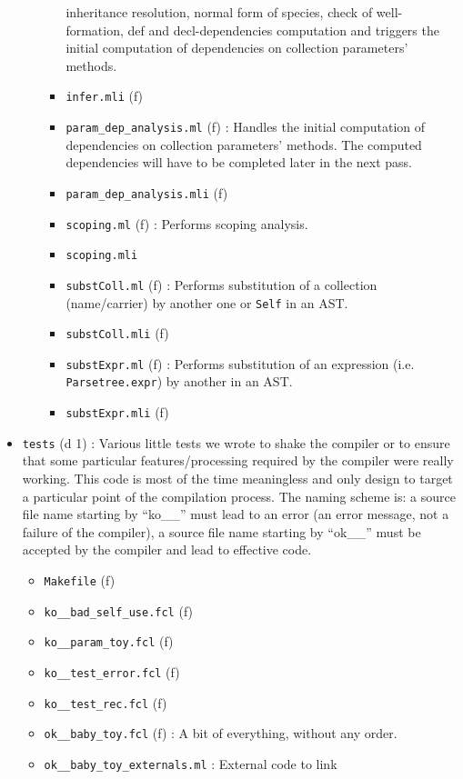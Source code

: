 \begin{itemize}
\begin{itemize}
\begin{itemize}
      inheritance resolution, normal form of species, check of
      well-formation, def and decl-dependencies computation and
      triggers the initial computation of dependencies on collection
      parameters' methods.
    \item {\tt infer.mli} (f)
    \item {\tt param\_dep\_analysis.ml} (f) : Handles the initial
      computation of dependencies on collection parameters'
      methods. The computed dependencies will have to be completed
      later in the next pass.
    \item {\tt param\_dep\_analysis.mli} (f)
    \item {\tt scoping.ml} (f) : Performs scoping analysis.
    \item {\tt scoping.mli}
    \item {\tt substColl.ml} (f) : Performs substitution of a
      collection (name/carrier) by another one or {\tt Self} in an
      AST.
    \item {\tt substColl.mli} (f)
    \item {\tt substExpr.ml} (f) : Performs substitution of an
    expression (i.e. {\tt Parsetree.expr}) by another in an AST.
    \item {\tt substExpr.mli} (f)
    \end{itemize}
  \end{itemize}
\item {\tt tests} (d 1) : Various little tests we wrote to shake the
  compiler or to ensure that some particular features/processing
  required by the compiler were really working. This code is most of
  the time meaningless and only design to target a particular point of
  the compilation process. The naming scheme is: a source file name
  starting by ``ko\_\_'' must lead to an error (an error message, not
  a failure of the compiler), a source file name starting by
  ``ok\_\_'' must be accepted by the compiler and lead to effective
  code.
  \begin{itemize}
  \item {\tt Makefile} (f)
  \item {\tt ko\_\_bad\_self\_use.fcl} (f)
  \item {\tt ko\_\_param\_toy.fcl} (f)
  \item {\tt ko\_\_test\_error.fcl} (f)
  \item {\tt ko\_\_test\_rec.fcl} (f)
  \item {\tt ok\_\_baby\_toy.fcl} (f) : A bit of everything, without
    any order.
  \item {\tt ok\_\_baby\_toy\_externals.ml} : External code to link

\end{itemize}
\end{itemize}
